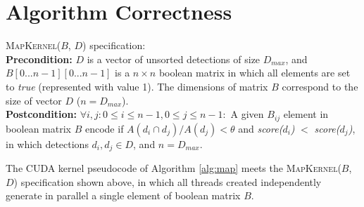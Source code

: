\section{Algorithm Correctness}

\textsc{MapKernel($B$, $D$)} specification:\\

\noindent \textbf{Precondition:} $D$ is a vector of unsorted detections of size $D_{max}$, and $B[0...n-1][0...n-1]$ is a $n \times n$ boolean 
matrix in which all elements are set to \emph{true} (represented with value 1). The dimensions of matrix $B$ correspond to the 
size of vector $D$ ($n = D_{max}$). \\

\noindent \textbf{Postcondition:} $\forall i,j: 0 \leq i \leq n-1, 0 \leq j \leq n-1:$ A given $B_{ij}$ element in boolean matrix $B$ encode if 
$A(d_{i} \cap d_{j}) / A(d_{j}) < \theta$ and \emph{score($d_{i}$)} $<$ \emph{score($d_{j}$)}, in which detections $d_{i},d_{j} \in D$, and 
$n = D_{max}$. \\

\begin{theorem}
The CUDA kernel pseudocode of Algorithm \ref{alg:map} meets the \textsc{MapKernel($B$, $D$)} specification shown above, in which 
all threads created independently generate in parallel a single element of boolean matrix $B$.
\end{theorem}

